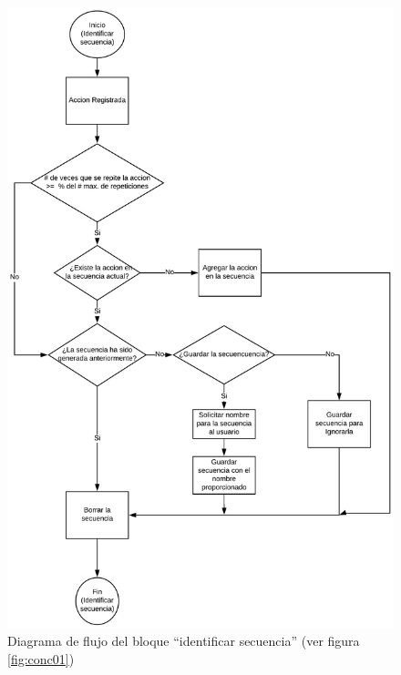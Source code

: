 \begin{figure}[]
\centering
\includegraphics[width=1.0\columnwidth]{chap4/Imagenes/concepto2.eps}
\caption{Diagrama de flujo del bloque ``identificar secuencia'' (ver figura \ref{fig:conc01})}
\label{fig:conc02}
\end{figure} 